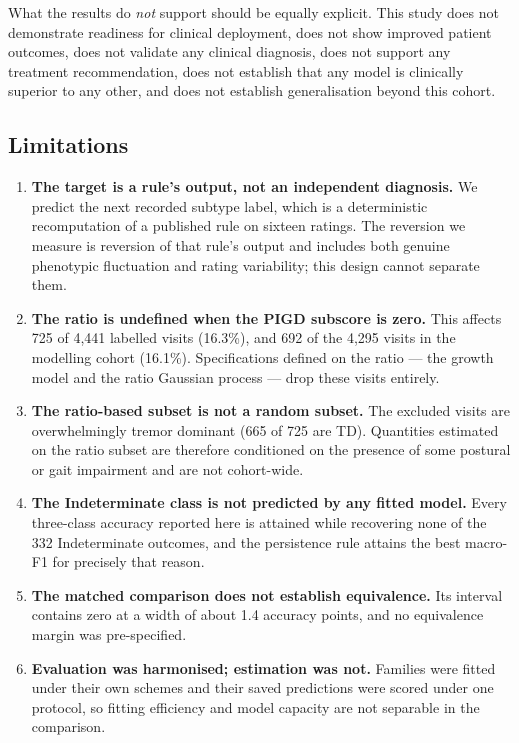 \documentclass[11pt]{article}
\begin{document}
What the results do \emph{not} support should be equally explicit. This study
does not demonstrate readiness for clinical deployment, does not show improved
patient outcomes, does not validate any clinical diagnosis, does not support any
treatment recommendation, does not establish that any model is clinically
superior to any other, and does not establish generalisation beyond this cohort.

\subsection{Limitations}
\label{sec:limits}

\begin{enumerate}
\itemsep3pt
\item \textbf{The target is a rule's output, not an independent diagnosis.} We
predict the next recorded subtype label, which is a deterministic recomputation
of a published rule on sixteen ratings. The reversion we measure is reversion of
that rule's output and includes both genuine phenotypic fluctuation and rating
variability; this design cannot separate them.

\item \textbf{The ratio is undefined when the PIGD subscore is zero.} This
affects 725 of 4,441 labelled visits (16.3\%), and 692 of the 4,295 visits in
the modelling cohort (16.1\%). Specifications defined on the ratio --- the
growth model and the ratio Gaussian process --- drop these visits entirely.

\item \textbf{The ratio-based subset is not a random subset.} The excluded
visits are overwhelmingly tremor dominant (665 of 725 are TD). Quantities
estimated on the ratio subset are therefore conditioned on the presence of some
postural or gait impairment and are not cohort-wide.

\item \textbf{The Indeterminate class is not predicted by any fitted model.}
Every three-class accuracy reported here is attained while recovering none of
the 332 Indeterminate outcomes, and the persistence rule attains the best
macro-F1 for precisely that reason.

\item \textbf{The matched comparison does not establish equivalence.} Its
interval contains zero at a width of about 1.4 accuracy points, and no
equivalence margin was pre-specified.

\item \textbf{Evaluation was harmonised; estimation was not.} Families were
fitted under their own schemes and their saved predictions were scored under one
protocol, so fitting efficiency and model capacity are not separable in the
comparison.


\end{enumerate}
\end{document}
